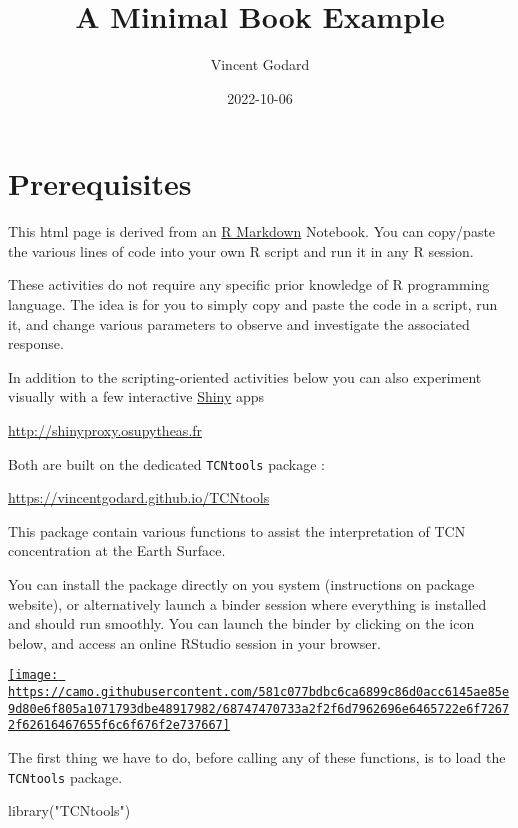 \documentclass[
]{book}
\title{A Minimal Book Example}
\author{Vincent Godard}
\date{2022-10-06}
\newenvironment{Shaded}{\begin{snugshade}}{\end{snugshade}}
\newcommand{\FunctionTok}[1]{\textcolor[rgb]{0.00,0.00,0.00}{#1}}
\newcommand{\NormalTok}[1]{#1}
\newcommand{\StringTok}[1]{\textcolor[rgb]{0.31,0.60,0.02}{#1}}
\begin{document}
\maketitle

{
\setcounter{tocdepth}{1}
\tableofcontents
}
\hypertarget{prerequisites}{%
\chapter{Prerequisites}\label{prerequisites}}

This html page is derived from an \href{http://rmarkdown.rstudio.com}{R Markdown} Notebook.
You can copy/paste the various lines of code into your own R script and run it in any R session.

These activities do not require any specific prior knowledge of R programming language.
The idea is for you to simply copy and paste the code in a script, run it, and change various parameters to observe and investigate the associated response.

In addition to the scripting-oriented activities below you can also experiment visually with a few interactive \href{https://shiny.rstudio.com}{Shiny} apps

\url{http://shinyproxy.osupytheas.fr}

Both are built on the dedicated \texttt{TCNtools} package :

\url{https://vincentgodard.github.io/TCNtools}

This package contain various functions to assist the interpretation of TCN concentration at the Earth Surface.

You can install the package directly on you system (instructions on package website), or alternatively launch a binder session where everything is installed and should run smoothly.
You can launch the binder by clicking on the icon below, and access an online RStudio session in your browser.

\href{https://mybinder.org/v2/gh/VincentGodard/TCNtools/main?urlpath=rstudio}{\texttt{[image: https://camo.githubusercontent.com/581c077bdbc6ca6899c86d0acc6145ae85e9d80e6f805a1071793dbe48917982/68747470733a2f2f6d7962696e6465722e6f72672f62616467655f6c6f676f2e737667]}}

The first thing we have to do, before calling any of these functions, is to load the \texttt{TCNtools} package.

\begin{Shaded}
\begin{Highlighting}[]
\FunctionTok{library}\NormalTok{(}\StringTok{"TCNtools"}\NormalTok{)}
\end{Highlighting}
\end{Shaded}
\end{document}
